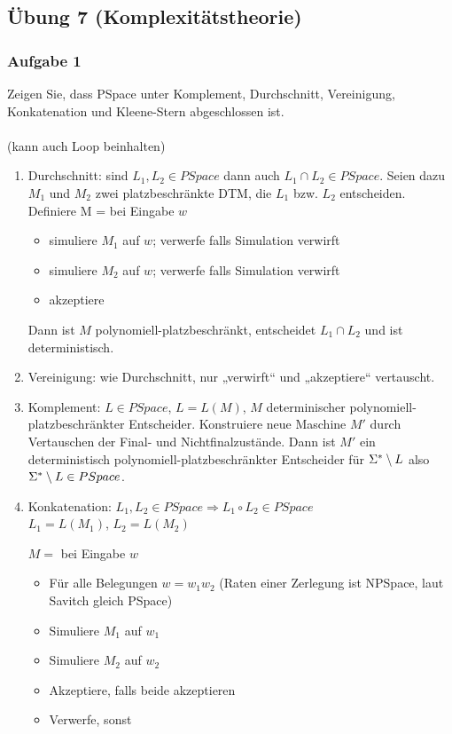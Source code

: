 \subsection*{Übung 7 (Komplexitätstheorie)}
\subsubsection*{Aufgabe 1}
    Zeigen Sie, dass PSpace unter Komplement, Durchschnitt, Vereinigung, Konkatenation und Kleene-Stern abgeschlossen ist. \\

    \LOES \\
     (kann auch Loop beinhalten)
    \begin{enumerate}
        \item Durchschnitt: sind $L_{1}, L_{2} \in PSpace$ dann auch $L_{1} \cap L_{2} \in PSpace$. Seien dazu $M_{1}$ und $M_{2}$ zwei platzbeschränkte DTM, die $L_{1}$ bzw. $L_{2}$ entscheiden.
            Definiere M = bei Eingabe $w$
            \begin{itemize}
                \item simuliere $M_{1}$ auf $w$; verwerfe falls Simulation verwirft
                \item simuliere $M_{2}$ auf $w$; verwerfe falls Simulation verwirft
                \item akzeptiere
            \end{itemize}
            Dann ist $M$ polynomiell-platzbeschränkt, entscheidet $L_{1} \cap L_{2}$ und ist deterministisch.

        \item Vereinigung: wie Durchschnitt, nur „verwirft“ und „akzeptiere“ vertauscht.

        \item Komplement: $L \in PSpace$, $L = L(M)$, $M$ determinischer polynomiell-platzbeschränkter Entscheider.
            Konstruiere neue Maschine $M'$ durch Vertauschen der Final- und Nichtfinalzustände. Dann ist $M'$ ein deterministisch polynomiell-platzbeschränkter Entscheider für $\Sigma^{*} \setminus L$ also $\Sigma^{*} \setminus L \in PSpace$.

        \item Konkatenation: $L_{1}, L_{2} \in PSpace \Rightarrow L_{1} \circ L_{2} \in PSpace$ \\
            $L_{1} = L(M_{1})$, $L_{2} = L(M_{2})$

            $M =$ bei Eingabe $w$
            \begin{itemize}
                \item Für alle Belegungen $w = w_{1} w_{2}$ (Raten einer Zerlegung ist NPSpace, laut Savitch gleich PSpace)
                \item Simuliere $M_{1}$ auf $w_{1}$
                \item Simuliere $M_{2}$ auf $w_{2}$
                \item Akzeptiere, falls beide akzeptieren
                \item Verwerfe, sonst
            \end{itemize}


\end{enumerate}
